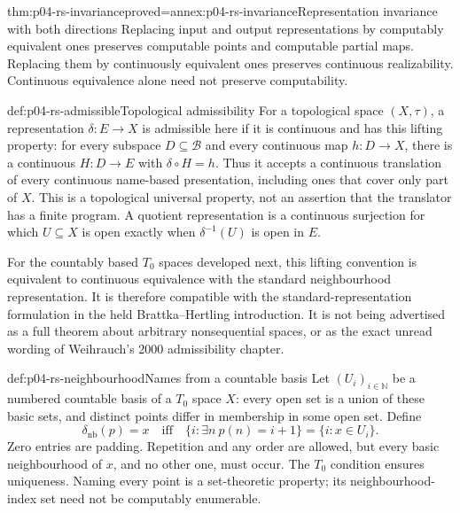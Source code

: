 \begin{hbtheorem}{thm:p04-rs-invariance}{proved=annex:p04-rs-invariance}{Representation invariance with both directions}
Replacing input and output representations by computably
equivalent ones preserves computable points and computable
partial maps. Replacing them by continuously equivalent ones
preserves continuous realizability.
Continuous equivalence alone need not preserve computability.
\end{hbtheorem}

\begin{hbdefinition}{def:p04-rs-admissible}{Topological admissibility}
For a topological space \((X,\tau)\), a representation
\(\delta:E\to X\) is admissible here if it is continuous and has
this lifting property: for every subspace \(D\subseteq\mathcal B\)
and every continuous map \(h:D\to X\), there is a continuous
\(H:D\to E\) with \(\delta\circ H=h\).
Thus it accepts a continuous translation of every continuous
name-based presentation, including ones that cover only part of
\(X\). This is a topological universal property, not an assertion
that the translator has a finite program.
A quotient representation is a continuous surjection for which
\(U\subseteq X\) is open exactly when \(\delta^{-1}(U)\)
is open in \(E\).
\end{hbdefinition}

For the countably based \(T_0\) spaces developed next, this lifting
convention is equivalent to continuous equivalence with the
standard neighbourhood representation.
It is therefore compatible with the standard-representation
formulation in the held Brattka--Hertling introduction.
It is not being advertised as a full theorem about arbitrary
nonsequential spaces, or as the exact unread wording of
Weihrauch's 2000 admissibility chapter.

\begin{hbdefinition}{def:p04-rs-neighbourhood}{Names from a countable basis}
Let \((U_i)_{i\in\mathbb N}\) be a numbered countable basis of
a \(T_0\) space \(X\): every open set is a union of these basic
sets, and distinct points differ in membership in some open set.
Define
\[
 \delta_{\mathrm{nb}}(p)=x
 \quad\text{iff}\quad
 \{i:\exists n\ p(n)=i+1\}=\{i:x\in U_i\}.
\]
Zero entries are padding. Repetition and any order are allowed,
but every basic neighbourhood of \(x\), and no other one, must
occur. The \(T_0\) condition ensures uniqueness. Naming every
point is a set-theoretic property; its neighbourhood-index set
need not be computably enumerable.
\end{hbdefinition}

